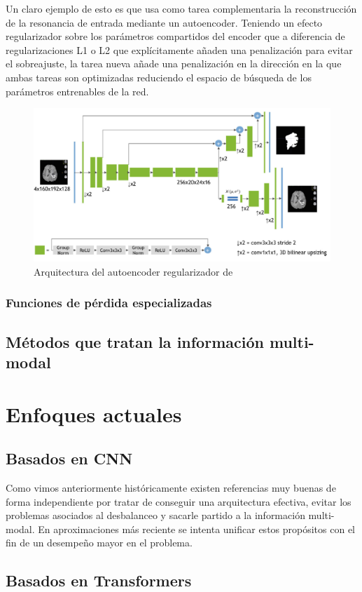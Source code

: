 			Un claro ejemplo de esto es \cite{myronenko20193d} que usa como tarea complementaria la reconstrucción de la resonancia de entrada mediante un autoencoder. Teniendo un efecto regularizador sobre los parámetros compartidos del encoder que a diferencia de regularizaciones L1 o L2 que explícitamente añaden una penalización para evitar el sobreajuste, la tarea nueva añade una penalización en la dirección en la que ambas tareas son optimizadas reduciendo el espacio de búsqueda de los parámetros entrenables de la red.
			
			\begin{figure}[!h]
				\centering
				\includegraphics[width=1.0\linewidth]{imagenes/myroenko2019.png}
				\caption{Arquitectura del autoencoder regularizador de \cite{myronenko20193d}}
			\end{figure}
			
				
			\subsubsection{Funciones de pérdida especializadas}
			
			
		\subsection{Métodos que tratan la información multi-modal}


\section{Enfoques actuales}
	\subsection{Basados en CNN}
	
	Como vimos anteriormente históricamente existen referencias muy buenas de forma independiente por tratar de conseguir una arquitectura efectiva, evitar los problemas asociados al desbalanceo y sacarle partido a la información multi-modal. En aproximaciones más reciente se intenta unificar estos propósitos con el fin de un desempeño mayor en el problema.
	
	
	\subsection{Basados en Transformers}


